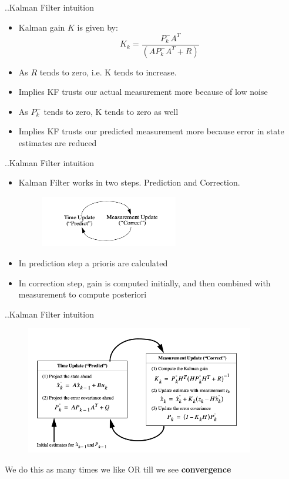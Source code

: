\documentclass{beamer}
\begin{document}
\begin{frame}{..Kalman Filter intuition}
\begin{itemize}
   \item Kalman gain \(K\) is given by:
     \[  
        K_k = \dfrac{P_k^- A^T}{(AP_k^-A^T + R)}
         \]
  \item As \(R\) tends to zero, i.e. K tends to increase.
  \item Implies KF trusts our actual measurement more because of low noise 
  \item As \(P_k^-\) tends to zero, K tends to zero as well
  \item Implies KF trusts our predicted measurement more because error in state estimates are reduced
\end{itemize}
\vskip 1cm
\end{frame}

\begin{frame}{..Kalman Filter intuition}
\begin{itemize}
  \item Kalman Filter works in two steps. Prediction and Correction.
  \begin{figure} [ht!]
    \includegraphics[width=60mm]{images/predictcorrect.png}
  \end{figure}
  \item In prediction step a prioris are calculated
  \item In correction step, gain is computed initially, and then combined with measurement to compute posteriori
\end{itemize}
\vskip 1cm
\end{frame}
\begin{frame}{..Kalman Filter intuition}
\begin{figure} [ht!]
    \includegraphics[width=100mm]{images/predictcorrectequations.png}
\end{figure}
We do this as many times we like OR till we see \textbf{convergence}
\vskip 1cm
\end{frame}
\end{document}
